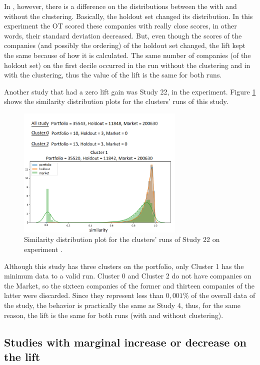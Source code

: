 In \nameExperimentII{}, however, there is a difference on the distributions between the with and without the clustering. Basically, the holdout set changed its distribution. In this experiment the OT scored these companies with really close scores, in other words, their standard deviation decreased. But, even though the scores of the companies (and possibly the ordering) of the holdout set changed, the lift kept the same because of how it is calculated. The same number of companies (of the holdout set) on the first decile occurred in the run without the clustering and in with the clustering, thus the value of the lift is the same for both runs.

Another study that had a zero lift gain was Study 22, in the \nameExperimentI{} experiment. Figure \ref{fig:study-22-clusters-simi-plot} shows the similarity distribution plots for the clusters' runs of this study.

\begin{figure}[!ht]
   \centering
   \includegraphics[width=8cm   ]{fig/ch4-study-22-clusters-simi-plot.png}
   \caption{Similarity distribution plot for the clusters' runs of Study 22 on experiment \nameExperimentI{}.}
   \label{fig:study-22-clusters-simi-plot}
\end{figure}

Although this study has three clusters on the portfolio, only Cluster 1 has the minimum data to a valid run. Cluster 0 and Cluster 2 do not have companies on the Market, so the sixteen companies of the former and thirteen companies of the latter were discarded. Since they represent less than $0,001\%$ of the overall data of the study, the behavior is practically the same as Study 4, thus, for the same reason, the lift is the same for both runs (with and without clustering).

\subsection{Studies with marginal increase or decrease on the lift}
\label{ch:marginal-change}

